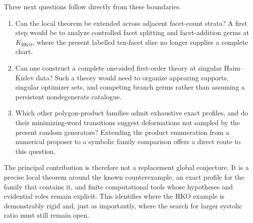 Three next questions follow directly from these boundaries.
\begin{enumerate}
  \item Can the local theorem be extended across adjacent facet-count strata?
    A first step would be to analyze controlled facet splitting and
    facet-addition germs at \(K_{\mathrm{HKO}}\), where the present labelled
    ten-facet slice no longer supplies a complete chart.
  \item Can one construct a complete one-sided first-order theory at singular
    Haim--Kislev data?  Such a theory would need to organize appearing
    supports, singular optimizer sets, and competing branch germs rather than
    assuming a persistent nondegenerate catalogue.
  \item Which other polygon-product families admit exhaustive exact profiles,
    and do their minimizing-word transitions suggest deformations not sampled
    by the present random generators?  Extending the product enumeration from
    a numerical proposer to a symbolic family comparison offers a direct route
    to this question.
\end{enumerate}

The principal contribution is therefore not a replacement global conjecture.
It is a precise local theorem around the known counterexample, an exact profile
for the family that contains it, and finite computational tools whose
hypotheses and evidential roles remain explicit.  This identifies where the
HKO example is demonstrably rigid and, just as importantly, where the search
for larger systolic ratio must still remain open.

